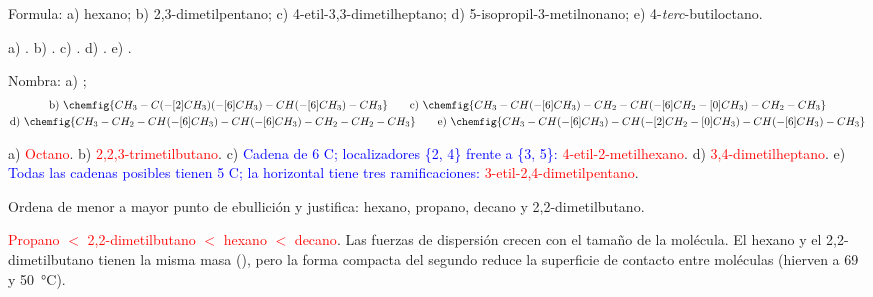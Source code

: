 \begin{exercise}
    Formula: a) hexano; b) 2,3-dimetilpentano; c) 4-etil-3,3-dimetilheptano; d) 5-isopropil-3-metilnonano; e)
    4-\emph{terc}-butiloctano.
    \begin{solu}
        a) \textcolor{red}{}. b) \textcolor{red}{}.
        c) \textcolor{red}{}.
        d) \textcolor{red}{}.
        e) \textcolor{red}{}.
    \end{solu}
\end{exercise}

\begin{exercise}
    Nombra: a) ;
    \begin{gather*}
        \text{b)}\ \chemfig{CH_3-C(-[2]CH_3)(-[6]CH_3)-CH(-[6]CH_3)-CH_3} \qquad
        \text{c)}\ \chemfig{CH_3-CH(-[6]CH_3)-CH_2-CH(-[6]CH_2-[0]CH_3)-CH_2-CH_3} \\
        \text{d)}\ \chemfig{CH_3-CH_2-CH(-[6]CH_3)-CH(-[6]CH_3)-CH_2-CH_2-CH_3} \qquad
        \text{e)}\ \chemfig{CH_3-CH(-[6]CH_3)-CH(-[2]CH_2-[0]CH_3)-CH(-[6]CH_3)-CH_3}
    \end{gather*}
    \begin{solu}
        a) \textcolor{red}{Octano}. b) \textcolor{red}{2,2,3-trimetilbutano}. c) \textcolor{blue}{Cadena de 6 C; localizadores
        \{2, 4\} frente a \{3, 5\}:} \textcolor{red}{4-etil-2-metilhexano}. d) \textcolor{red}{3,4-dimetilheptano}.
        e) \textcolor{blue}{Todas las cadenas posibles tienen 5 C; la horizontal tiene tres ramificaciones:}
        \textcolor{red}{3-etil-2,4-dimetilpentano}.
    \end{solu}
\end{exercise}

\begin{exercise}
    Ordena de menor a mayor punto de ebullición y justifica: hexano, propano, decano y 2,2-dimetilbutano.
    \begin{solu}
        \textcolor{red}{Propano \(<\) 2,2-dimetilbutano \(<\) hexano \(<\) decano}. Las fuerzas de dispersión crecen con el tamaño de
        la molécula. El hexano y el 2,2-dimetilbutano tienen la misma masa (), pero la forma compacta del segundo reduce la
        superficie de contacto entre moléculas (hierven a 69 y \qty{50}{\degreeCelsius}).
    \end{solu}
\end{exercise}

